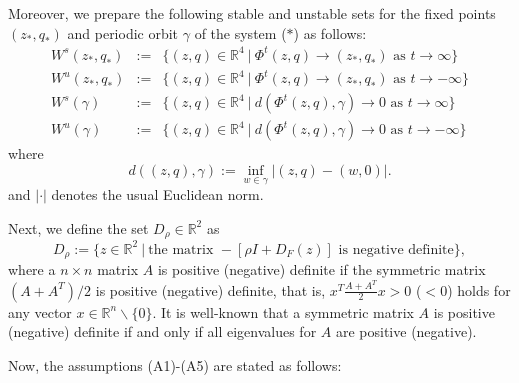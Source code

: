 \documentclass[11pt,reqno]{amsart}
\begin{document}
Moreover, we prepare the following stable and unstable sets for the fixed points $(z_*,q_*)$ and periodic orbit $\gamma$ of the system ($\ast$) as follows:
\begin{eqnarray}
W^s(z_*,q_*)&:=&\{(z,q)\in\mathbb{R}^4\ |\ \Phi^t(z,q)\to (z_*,q_*) \text{ as } t\to\infty\}\nonumber\\
W^u(z_*,q_*)&:=&\{(z,q)\in\mathbb{R}^4\ |\ \Phi^t(z,q)\to (z_*,q_*) \text{ as } t\to -\infty\}\nonumber\\
W^s(\gamma)&:=&\{(z,q)\in\mathbb{R}^4\ |\ d(\Phi^t(z,q),\gamma) \to 0 \text{ as } t\to\infty\}\nonumber\\
W^u(\gamma)&:=&\{(z,q)\in\mathbb{R}^4\ |\ d(\Phi^t(z,q),\gamma) \to 0 \text{ as } t\to -\infty\}\nonumber
\end{eqnarray}
where 
$$
d((z,q),\gamma):=\inf_{w\in\gamma}|(z,q)-(w,0)|.
$$
and $|\cdot|$ denotes the usual Euclidean norm.

Next, we define the set $D_\rho\in\mathbb{R}^2$ as 
$$
D_\rho:=\{z\in\mathbb{R}^2\ |\ \text{the matrix } -[\rho I+D_F(z)] \text{ is negative definite}\},
$$
where a $n\times n$ matrix $A$ is positive (negative) definite if the symmetric matrix $(A+A^T)/2$ is positive (negative) definite, that is, $x^T\frac{A+A^T}{2} x > 0$ ($<0$) holds for any vector $x\in\mathbb{R}^n\backslash \{0\}$. It is well-known that a symmetric matrix $A$ is positive (negative) definite if and only if all eigenvalues for $A$ are positive (negative). 

Now, the assumptions (A1)-(A5) are stated as follows:
\end{document}
